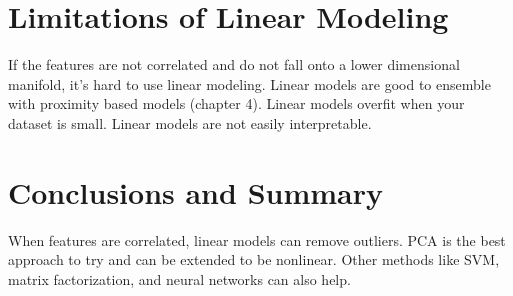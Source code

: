 \documentclass[a4paper]{article}
\begin{document}
\section{Limitations of Linear Modeling}
If the features are not correlated and do not fall onto a lower dimensional
manifold, it's hard to use linear modeling. Linear models are good to
ensemble with proximity based models (chapter 4). Linear models overfit when
your dataset is small. Linear models are not easily interpretable.

\section{Conclusions and Summary}
When features are correlated, linear models can remove outliers. PCA is the
best approach to try and can be extended to be nonlinear. Other methods
like SVM, matrix factorization, and neural networks can also help.
\end{document}
